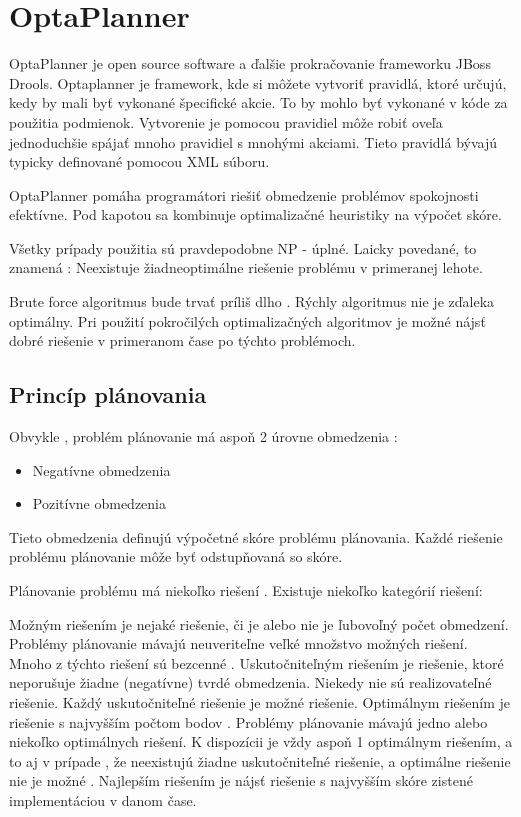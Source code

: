 \section{OptaPlanner}
OptaPlanner je open source software a ďalšie prokračovanie frameworku JBoss Drools. Optaplanner je framework, kde si môžete vytvoriť pravidlá, ktoré určujú, kedy by mali byť vykonané špecifické akcie. To by mohlo byť vykonané v kóde za použitia podmienok. Vytvorenie je pomocou pravidiel  môže robiť  oveľa jednoduchšie spájať mnoho pravidiel s mnohými akciami. Tieto pravidlá bývajú typicky definované pomocou XML súboru.

OptaPlanner pomáha  programátori riešiť obmedzenie problémov spokojnosti efektívne. Pod kapotou sa kombinuje optimalizačné heuristiky na výpočet skóre.




Všetky prípady použitia sú pravdepodobne NP - úplné. Laicky povedané, to znamená :
Neexistuje žiadneoptimálne riešenie problému v primeranej lehote.



Brute force algoritmus  bude trvať príliš dlho .
Rýchly algoritmus nie je zďaleka optimálny.
Pri použití pokročilých optimalizačných algoritmov je možné nájsť dobré riešenie v primeranom čase po týchto problémoch.

\subsection{Princíp plánovania}
Obvykle , problém plánovanie má aspoň 2 úrovne obmedzenia :
\begin{itemize}
\item Negatívne obmedzenia
\item Pozitívne obmedzenia
\end{itemize}

Tieto obmedzenia definujú výpočetné skóre problému plánovania. Každé riešenie problému plánovanie môže byť odstupňovaná so skóre. 

Plánovanie problému má niekoľko riešení . Existuje niekoľko kategórií riešení:

Možným riešením je nejaké riešenie, či je alebo nie je ľubovoľný počet obmedzení. Problémy plánovanie mávajú neuveriteľne veľké množstvo možných riešení. Mnoho z týchto riešení sú bezcenné .
Uskutočniteľným riešením je riešenie, ktoré neporušuje žiadne (negatívne) tvrdé obmedzenia. Niekedy nie sú realizovateľné riešenie. Každý uskutočniteľné riešenie je možné riešenie.
Optimálnym riešením je riešenie s najvyšším počtom bodov . Problémy plánovanie mávajú jedno alebo niekoľko optimálnych riešení. K dispozícii je vždy aspoň 1 optimálnym riešením, a to aj v prípade , že neexistujú žiadne uskutočniteľné riešenie, a optimálne riešenie nie je možné .
Najlepším riešením je nájsť riešenie s najvyšším skóre zistené implementáciou v danom čase.


